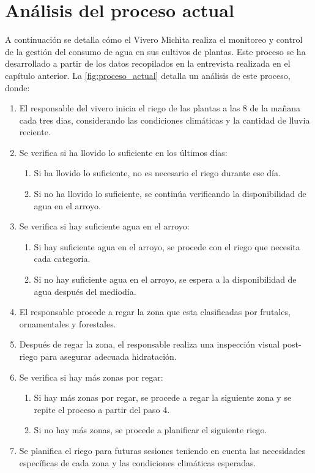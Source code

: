 \section{Análisis del proceso actual}

A continuación se detalla cómo el Vivero Michita realiza el monitoreo y control de la gestión del consumo de agua en sus cultivos de plantas. Este proceso se ha desarrollado a partir de los datos recopilados en la entrevista realizada en el capítulo anterior. La \ref{fig:proceso_actual} detalla un análisis de este proceso, donde:

\begin{enumerate}
    \item El responsable del vivero inicia el riego de las plantas a las 8 de la mañana cada tres dias, considerando las condiciones climáticas y la cantidad de lluvia reciente.
    \item Se verifica si ha llovido lo suficiente en los últimos días:
          \begin{enumerate}[label=(\alph*)]
              \item Si ha llovido lo suficiente, no es necesario el riego durante ese día.
              \item Si no ha llovido lo suficiente, se continúa verificando la disponibilidad de agua en el arroyo.
          \end{enumerate}
    \item Se verifica si hay suficiente agua en el arroyo:
          \begin{enumerate}[label=(\alph*)]
              \item Si hay suficiente agua en el arroyo, se procede con el riego que necesita cada categoría.
              \item Si no hay suficiente agua en el arroyo, se espera a la disponibilidad de agua después del mediodía.
          \end{enumerate}
    \item El responsable procede a regar la zona que esta clasificadas por frutales, ornamentales y forestales.
    \item Después de regar la zona, el responsable realiza una inspección visual post-riego para asegurar adecuada hidratación.
    \item Se verifica si hay más zonas por regar:
          \begin{enumerate}[label=(\alph*)]
              \item Si hay más zonas por regar, se procede a regar la siguiente zona y se repite el proceso a partir del paso 4.
              \item Si no hay más zonas, se procede a planificar el siguiente riego.
          \end{enumerate}
    \item Se planifica el riego para futuras sesiones teniendo en cuenta las necesidades específicas de cada zona y las condiciones climáticas esperadas.
\end{enumerate}

